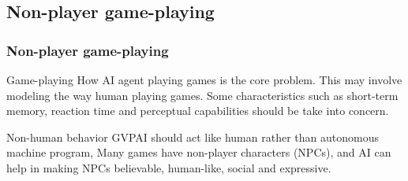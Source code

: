 \documentclass{beamer}
\begin{document}
\subsection{Non-player game-playing}
\begin{frame}
\frametitle{Non-player game-playing\cite{9}}
\begin{block}{Game-playing}
How AI agent playing games is the core problem. This may involve modeling the way human playing games. Some characteristics such as short-term memory, reaction time and perceptual capabilities should be take into concern.
\end{block}

\begin{block}{Non-human behavior}
GVPAI should act like human rather than autonomous machine program, 
Many games have non-player characters (NPCs), and AI can help in making NPCs believable, human-like, social and expressive.
\end{block}
 
\end{frame}

\end{document}
